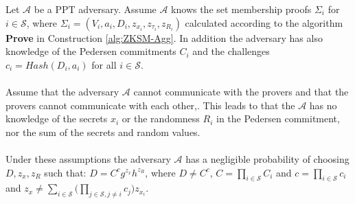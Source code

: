 \hspace{10pt}
\begin{thm}
\label{thm:aggrgeation}

Let $\mathcal{A}$ be a PPT adversary. Assume $\mathcal{A}$ knows 
the set membership proofs $\Sigma_i$ for $i\in\mathcal{S}$, where $\Sigma_i=(V_i,a_i,D_i,z_{x_i},z_{\tau_i},z_{R_i})$ calculated according to the algorithm \textbf{Prove} in Construction \ref{alg:ZKSM-Agg}. In addition the adversary has also knowledge of the Pedersen commitments $C_i$ and the challenges $c_i=Hash(D_i,a_i)$ for all $i\in\mathcal{S}$.\\
\\
Assume that the adversary  $\mathcal{A}$ cannot communicate with the provers and that the provers cannot communicate with each other,. This leads to that the  $\mathcal{A}$ has no knowledge of the secrets $x_i$ or the randomness $R_i$ in the Pedersen commitment, nor the sum of the secrets and random values. \\
\\
Under these assumptions the adversary $\mathcal{A}$ has a negligible probability of choosing $D,z_x,z_R$ such that: $D = C^cg^{z_x}h^{z_R}$, where $D\neq C^c$, $C=\prod_{i\in\mathcal{S}}C_i$ and $c=\prod_{i\in\mathcal{S}}c_i$ and  $z_x \neq \sum_{i\in\mathcal{S}} \Big( \prod_{j\in\mathcal{S}, j\neq i} c_j \big) z_{x_i}$. 




\end{thm}
